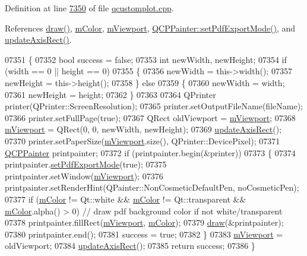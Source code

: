 Definition at line \hyperlink{a00115_source_l07350}{7350} of file \hyperlink{a00115_source}{qcustomplot.\+cpp}.



References \hyperlink{a00116_a2e9b3d14dffa43c79835869d488936c9}{draw()}, \hyperlink{a00116_source_l02114}{m\+Color}, \hyperlink{a00116_source_l02110}{m\+Viewport}, \hyperlink{a00115_source_l13259}{Q\+C\+P\+Painter\+::set\+Pdf\+Export\+Mode()}, and \hyperlink{a00115_source_l08116}{update\+Axis\+Rect()}.


\begin{DoxyCode}
07351 \{
07352   \textcolor{keywordtype}{bool} success = \textcolor{keyword}{false};
07353   \textcolor{keywordtype}{int} newWidth, newHeight;
07354   \textcolor{keywordflow}{if} (width == 0 || height == 0)
07355   \{
07356     newWidth = this->width();
07357     newHeight = this->height();
07358   \} \textcolor{keywordflow}{else}
07359   \{
07360     newWidth = width;
07361     newHeight = height;
07362   \}
07363   
07364   QPrinter printer(QPrinter::ScreenResolution);
07365   printer.setOutputFileName(fileName);
07366   printer.setFullPage(\textcolor{keyword}{true});
07367   QRect oldViewport = \hyperlink{a00116_a69feeea9d5254eab8ba7f9be13f85e0b}{mViewport};
07368   \hyperlink{a00116_a69feeea9d5254eab8ba7f9be13f85e0b}{mViewport} = QRect(0, 0, newWidth, newHeight);
07369   \hyperlink{a00116_a428242419d3a1b63f2cbff637986c35c}{updateAxisRect}();
07370   printer.setPaperSize(\hyperlink{a00116_a69feeea9d5254eab8ba7f9be13f85e0b}{mViewport}.size(), QPrinter::DevicePixel);
07371   \hyperlink{a00047}{QCPPainter} printpainter;
07372   \textcolor{keywordflow}{if} (printpainter.begin(&printer))
07373   \{
07374     printpainter.\hyperlink{a00047_ae0931c24883ce8ea53103d3b80e0de56}{setPdfExportMode}(\textcolor{keyword}{true});
07375     printpainter.setWindow(\hyperlink{a00116_a69feeea9d5254eab8ba7f9be13f85e0b}{mViewport});
07376     printpainter.setRenderHint(QPainter::NonCosmeticDefaultPen, noCosmeticPen);
07377     \textcolor{keywordflow}{if} (\hyperlink{a00116_ac071280171e215ffc7d416118bc28d90}{mColor} != Qt::white && \hyperlink{a00116_ac071280171e215ffc7d416118bc28d90}{mColor} != Qt::transparent && \hyperlink{a00116_ac071280171e215ffc7d416118bc28d90}{mColor}.alpha() > 0) \textcolor{comment}{// draw
       pdf background color if not white/transparent}
07378       printpainter.fillRect(\hyperlink{a00116_a69feeea9d5254eab8ba7f9be13f85e0b}{mViewport}, \hyperlink{a00116_ac071280171e215ffc7d416118bc28d90}{mColor});
07379     \hyperlink{a00116_a2e9b3d14dffa43c79835869d488936c9}{draw}(&printpainter);
07380     printpainter.end();
07381     success = \textcolor{keyword}{true};
07382   \}
07383   \hyperlink{a00116_a69feeea9d5254eab8ba7f9be13f85e0b}{mViewport} = oldViewport;
07384   \hyperlink{a00116_a428242419d3a1b63f2cbff637986c35c}{updateAxisRect}();
07385   \textcolor{keywordflow}{return} success;
07386 \}
\end{DoxyCode}


